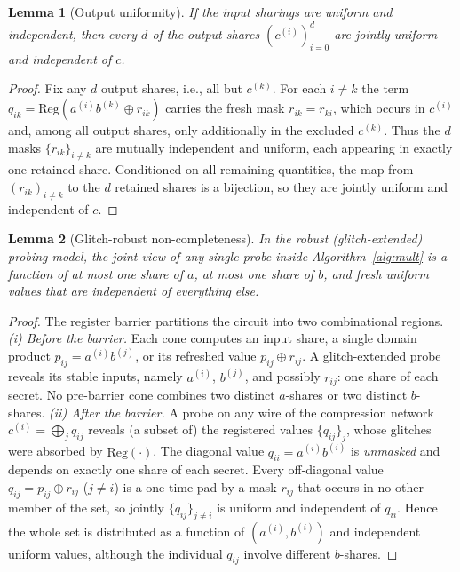 \documentclass[lettersize,journal]{IEEEtran}
\newtheorem{lemma}{Lemma}
\newcommand{\share}[2]{#1^{(#2)}}
\begin{document}
\begin{lemma}[Output uniformity]
\label{lem:unif}
If the input sharings are uniform and independent, then every $d$ of the output
shares $(\share{c}{i})_{i=0}^{d}$ are jointly uniform and independent of $c$.
\end{lemma}
\begin{proof}
Fix any $d$ output shares, i.e., all but $\share{c}{k}$. For each $i\neq k$ the
term $q_{ik}=\mathrm{Reg}(\share{a}{i}\share{b}{k}\oplus r_{ik})$ carries the
fresh mask $r_{ik}=r_{ki}$, which occurs in $\share{c}{i}$ and, among all output
shares, only additionally in the excluded $\share{c}{k}$. Thus the $d$ masks
$\{r_{ik}\}_{i\neq k}$ are mutually independent and uniform, each appearing in
exactly one retained share. Conditioned on all remaining quantities, the map
from $(r_{ik})_{i\neq k}$ to the $d$ retained shares is a bijection, so they are
jointly uniform and independent of $c$.
\end{proof}

\begin{lemma}[Glitch-robust non-completeness]
\label{lem:noncomp}
In the robust (glitch-extended) probing model, the joint view of any single
probe inside Algorithm~\ref{alg:mult} is a function of at most one share of
$a$, at most one share of $b$, and fresh uniform values that are independent
of everything else.
\end{lemma}
\begin{proof}
The register barrier partitions the circuit into two combinational regions.
\emph{(i) Before the barrier.} Each cone computes an input share, a single
domain product $p_{ij}=\share{a}{i}\share{b}{j}$, or its refreshed value
$p_{ij}\oplus r_{ij}$. A glitch-extended probe reveals its stable inputs,
namely $\share{a}{i}$, $\share{b}{j}$, and possibly $r_{ij}$: one share of each
secret. No pre-barrier cone combines two distinct $a$-shares or two distinct
$b$-shares. \emph{(ii) After the barrier.} A probe on any wire of the
compression network $\share{c}{i}=\bigoplus_j q_{ij}$ reveals (a subset of) the
registered values $\{q_{ij}\}_{j}$, whose glitches were absorbed by
$\mathrm{Reg}(\cdot)$. The diagonal value $q_{ii}=\share{a}{i}\share{b}{i}$ is
\emph{unmasked} and depends on exactly one share of each secret. Every
off-diagonal value $q_{ij}=p_{ij}\oplus r_{ij}$ ($j\neq i$) is a one-time pad
by a mask $r_{ij}$ that occurs in no other member of the set, so jointly
$\{q_{ij}\}_{j\neq i}$ is uniform and independent of $q_{ii}$. Hence the
whole set is distributed as a function of $(\share{a}{i},\share{b}{i})$ and
independent uniform values, although the individual $q_{ij}$ involve different
$b$-shares.
\end{proof}
\end{document}
